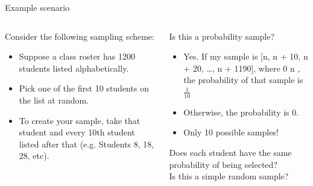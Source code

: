 \documentclass[aspectratio=169]{../latex_main/tntbeamer}  %
\begin{document}
		\begin{frame}{Example scenario}
	    \begin{columns}
	        \begin{column}{.3\textwidth}
	            Consider the following sampling scheme:

	            \begin{itemize}
	                \item Suppose a class roster has 1200 students listed alphabetically.
	                \item Pick one of the first 10 students on the list at random.
	                \item To create your sample, take that student and every 10th student listed after that (e.g. Students 8, 18, 28, etc).
	            \end{itemize}
                 
	        \end{column}
	        
	        \begin{column}{.6\textwidth}
	           Is this a probability sample?
	           \begin{itemize}
	               \item Yes. If my sample is [n, n + 10, n + 20, …, n + 1190], where 0 \leq n , the probability of that sample is $\frac{1}{10}$
	               \item Otherwise, the probability is 0.
	               \item Only 10 possible samples!
	           \end{itemize}
	           Does each student have the same probability of being selected?\\
	           \bigskip
	           Is this a simple random sample?


	        \end{column}
	        
	    \end{columns}
	    
	\end{frame}
	
\end{document}
